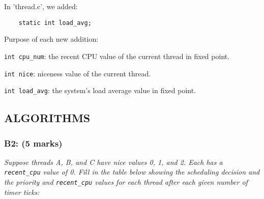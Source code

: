 \documentclass{article}
\begin{document}
In 'thread.c', we added:
\begin{lstlisting}
    static int load_avg;
\end{lstlisting}

Purpose of each new addition:

\texttt{int cpu\_num}: the recent CPU value of the current thread in fixed point.

\texttt{int nice}: niceness value of the current thread.

\texttt{int load\_avg}: the system's load average value in fixed point.


\subsection{ALGORITHMS}

\subsubsection*{B2: (5 marks) }
\textit{Suppose threads A, B, and C have nice values 0, 1, and 2.  Each has a \texttt{recent\_cpu} value of 0.  Fill in the table below showing the scheduling decision and the priority and \texttt{recent\_cpu} values for each thread after each given number of timer ticks:}
\end{document}
